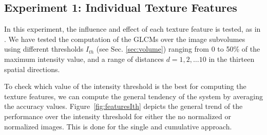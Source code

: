 \subsection{Experiment 1: Individual Texture Features}
In this experiment, the influence and effect of each texture feature is tested, as in \cite{Martinez-Murcia2013266}. We have tested the computation of the \acp{GLCM} over the image subvolumes using different thresholds $I_{th}$ (see Sec. \ref{sec:volume}) ranging from 0 to 50\% of the maximum intensity value, and a range of distances $d=1,2,\dots10$ in the thirteen spatial directions.

To check which value of the intensity threshold is the best for computing the texture features, we can compute the general tendency of the system by averaging the accuracy values. Figure~\ref{fig:featuresIth} depicts the general trend of the performance over the intensity threshold for either the no normalized or normalized images. This is done for the single and cumulative approach. 

